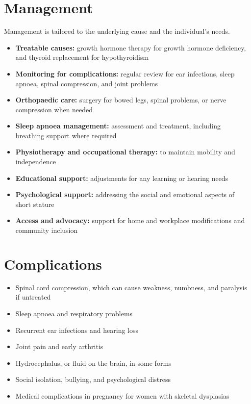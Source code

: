 \section*{Management}
Management is tailored to the underlying cause and the individual's needs.
\begin{itemize}
    \item \textbf{Treatable causes:} growth hormone therapy for growth hormone deficiency, and thyroid replacement for hypothyroidism
    \item \textbf{Monitoring for complications:} regular review for ear infections, sleep apnoea, spinal compression, and joint problems
    \item \textbf{Orthopaedic care:} surgery for bowed legs, spinal problems, or nerve compression when needed
    \item \textbf{Sleep apnoea management:} assessment and treatment, including breathing support where required
    \item \textbf{Physiotherapy and occupational therapy:} to maintain mobility and independence
    \item \textbf{Educational support:} adjustments for any learning or hearing needs
    \item \textbf{Psychological support:} addressing the social and emotional aspects of short stature
    \item \textbf{Access and advocacy:} support for home and workplace modifications and community inclusion
\end{itemize}

\section*{Complications}
\begin{itemize}
    \item Spinal cord compression, which can cause weakness, numbness, and paralysis if untreated
    \item Sleep apnoea and respiratory problems
    \item Recurrent ear infections and hearing loss
    \item Joint pain and early arthritis
    \item Hydrocephalus, or fluid on the brain, in some forms
    \item Social isolation, bullying, and psychological distress
    \item Medical complications in pregnancy for women with skeletal dysplasias
\end{itemize}

